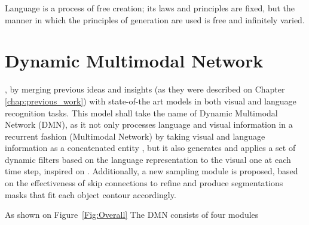 \begin{savequote}[75mm]
Language is a process of free creation; its laws and principles are fixed, but the manner in which the principles of generation are used is free and infinitely varied.
\end{savequote}

\chapter{Dynamic Multimodal Network}

, by merging previous ideas and insights (as they were described on Chapter \ref{chap:previous_work}) with state-of-the art models in both visual and language recognition tasks. This model shall take the name of Dynamic Multimodal Network (DMN), as it not only processes language and visual information in a recurrent fashion \cite{li2017cvpr} (Multimodal Network) by taking visual and language information as a concatenated entity \cite{hu2016segmentation}, but it also generates and applies a set of dynamic filters based on the language representation to the visual one at each time step, inspired on \cite{liu2017segmentation}. Additionally, a new sampling module is proposed, based on the effectiveness of skip connections \cite{DBLP:journals/corr/RonnebergerFB15} to refine and produce segmentations masks that fit each object contour accordingly.

As shown on Figure~\ref{Fig:Overall} The DMN consists of four modules

\begin{figure}
\centering

\end{figure}

